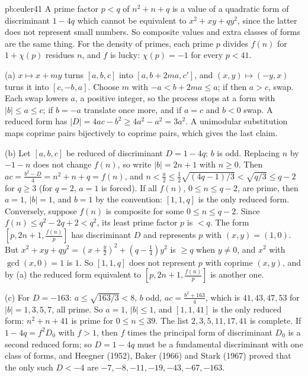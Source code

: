 \begin{solution}{pb:euler41}
\idea A prime factor $p<q$ of $n^2+n+q$ is a value of a quadratic form of discriminant $1-4q$ which cannot be equivalent to $x^2+xy+qy^2$, since the latter does not represent small
numbers. So composite values and extra classes of forms are the same thing. For the density of primes, each prime $p$ divides $f(n)$ for $1+\chi(p)$ residues $n$, and $f$ is lucky:
$\chi(p)=-1$ for every $p<41$.

\writeup (a) $x\mapsto x+my$ turns $[a,b,c]$ into $[a,b+2ma,c']$, and $(x,y)\mapsto(-y,x)$ turns it into $[c,-b,a]$. Choose $m$ with $-a<b+2ma\le a$; if then $a>c$, swap. Each swap
lowers $a$, a positive integer, so the process stops at a form with $|b|\le a\le c$; if $b=-a$ translate once more, and if $a=c$ and $b<0$ swap. A reduced form has
$|D|=4ac-b^2\ge4a^2-a^2=3a^2$. A unimodular substitution maps coprime pairs bijectively to coprime pairs, which gives the last claim.

(b) Let $[a,b,c]$ be reduced of discriminant $D=1-4q$; $b$ is odd. Replacing $n$ by $-1-n$ does not change $f(n)$, so write $|b|=2n+1$ with $n\ge0$. Then
$ac=\frac{b^2-D}4=n^2+n+q=f(n)$, and $n<\frac a2\le\frac12\sqrt{(4q-1)/3}<\sqrt{q/3}\le q-2$ for $q\ge3$ (for $q=2$, $a=1$ is forced). If all $f(n)$, $0\le n\le q-2$, are prime, then
$a=1$, $|b|=1$, and $b=1$ by the convention: $[1,1,q]$ is the only reduced form. Conversely, suppose $f(n)$ is composite for some $0\le n\le q-2$. Since
$f(n)\le q^2-2q+2<q^2$, its least prime factor $p$ is $<q$. The form $[p,2n+1,\frac{f(n)}p]$ has discriminant $D$ and represents $p$ with $(x,y)=(1,0)$. But
$x^2+xy+qy^2=(x+\frac y2)^2+(q-\frac14)y^2$ is $\ge q$ when $y\ne0$, and $x^2$ with $\gcd(x,0)=1$ is $1$. So $[1,1,q]$ does not represent $p$ with coprime $(x,y)$, and by (a) the reduced form
equivalent to $[p,2n+1,\frac{f(n)}p]$ is another one.

(c) For $D=-163$: $a\le\sqrt{163/3}<8$, $b$ odd, $ac=\frac{b^2+163}4$, which is $41,43,47,53$ for $|b|=1,3,5,7$, all prime. So $a=1$, $|b|\le1$, and $[1,1,41]$ is the only reduced
form: $n^2+n+41$ is prime for $0\le n\le39$. The list $2,3,5,11,17,41$ is complete. If $1-4q=f^2D_0$ with $f>1$, then $f$ times the principal form of discriminant $D_0$ is a second
reduced form; so $D=1-4q$ must be a fundamental discriminant with one class of forms, and Heegner (1952), Baker (1966) and Stark (1967) proved that the only such $D<-4$ are
$-7,-8,-11,-19,-43,-67,-163$.


\end{solution}
